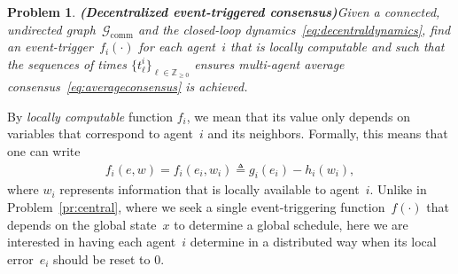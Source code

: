 \documentclass{autart}
\newtheorem{problem}[theorem]{Problem}
\newcommand{\integernonnegative}{\mathbb{Z}_{\ge 0}}
\newcommand{\GG}{{\mathcal{G}}}
\newcommand{\commgraph}{\GG_\text{comm}}
\newcommand{\longthmtitle}[1]{\mbox{}\textup{\textbf{(#1)}}}
\begin{document}
{
  \begin{problem}\longthmtitle{Decentralized event-triggered
      consensus}\label{pr:event-control}
    Given a connected, undirected graph~$\commgraph$ and the
    closed-loop dynamics~\eqref{eq:decentraldynamics}, find an
    event-trigger~$f_i(\cdot)$ for each agent~$i$ that is locally
    computable and such that the sequences of times $\{ t_\ell^i
    \}_{\ell \in \integernonnegative}$ ensures multi-agent average
    consensus~\eqref{eq:averageconsensus} is achieved.
\end{problem}

By \emph{locally computable} function $f_i$, we mean that its value
only depends on variables that correspond to agent~$i$ and its
neighbors. Formally, this means that one can write
\begin{align*}
  f_i(e,w) = f_i(e_i,w_i) \triangleq g_i(e_i) - h_i(w_i) ,
\end{align*}
where $w_i$ represents information that is locally available to
agent~$i$.  Unlike in Problem~\ref{pr:central}, where we seek a single
event-triggering function~$f(\cdot)$ that depends on the global
state~$x$ to determine a global schedule, here we are interested in
having each agent~$i$ determine in a distributed way when its local
error~$e_i$ should be reset to 0.}
\end{document}
